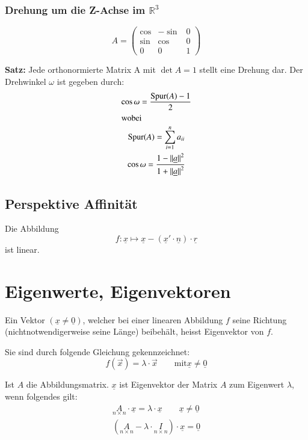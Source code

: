 \subsubsection{Drehung um die Z-Achse im $\mathbb{R}^3$}
\begin{equation}
  A = \begin{pmatrix}
		\cos & -\sin & 0    \\
		\sin & \cos  & 0    \\
		0    & 0     & 1
	\end{pmatrix}
\end{equation}

\textbf{Satz:} Jede orthonormierte Matrix A mit $\det{A}=1$ stellt eine
Drehung dar. Der Drehwinkel $\omega$ ist gegeben durch:
\begin{gather}
  \cos{\omega} = \frac{\text{Spur}(A)-1}{2} \\
  \intertext{wobei}
  \text{Spur}(A) = \sum_{i=1}^n a_{ii} \\
  \cos{\omega} = \frac{1-{\|\underline{a}\|}^2}{1+{\|\underline{a}\|}^2}
\end{gather}


\subsection{Perspektive Affinit\"at}
Die Abbildung
\begin{equation}
  f: \underline{x}\longmapsto\underline{x}-(\underline{x}'\cdot\underline{n})\cdot\underline{r}
\end{equation}
ist linear.


\section{Eigenwerte, Eigenvektoren}
Ein Vektor $(\underline{x}\neq\underline{0})$, welcher bei einer linearen Abbildung $f$ seine Richtung (nichtnotwendigerweise seine L\"ange) beibeh\"alt, heisst Eigenvektor von $f$.

Sie sind durch folgende Gleichung gekennzeichnet:
\begin{equation}
  f(\overrightarrow{x}) = \lambda\cdot\overrightarrow{x} \qquad\text{mit}\underline{x}\neq\underline{0}
\end{equation}

Ist $A$ die Abbildungsmatrix. $\underline{x}$ ist Eigenvektor der Matrix $A$ zum Eigenwert $\lambda$, wenn folgendes gilt:
\begin{gather}
  \underset{n\times n}{A}\cdot\underline{x} = \lambda\cdot\underline{x}\qquad\underline{x}\neq\underline{0} \\
  \left({\underset{n\times n}{A} - \lambda\cdot\underset{n\times n}{I}}\right)\cdot\underline{x} = \underline{0}
\end{gather}

